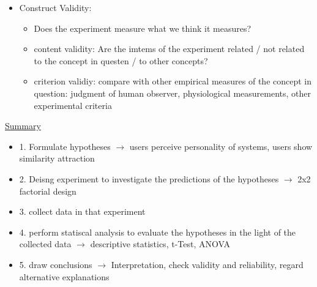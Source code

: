 \documentclass[a4paper,10pt,oneside]{article}
\begin{document}
\begin{itemize}
\begin{itemize}
\begin{itemize}
			 		\end{itemize}
			 	\item Construct Validity:
			 		\begin{itemize}
			 			\item Does the experiment measure what we think it measures?
			 			\item content validity: Are the imtems of the experiment related / not related to the concept in questen / to other concepts?
			 			\item criterion validiy: compare with other empirical measures of the concept in question: judgment of human observer, physiological measurements, other experimental criteria
			 		\end{itemize}
			 \end{itemize}
	\end{itemize}

\underline{Summary} \\
 	\begin{itemize}
 		\item 1. Formulate hypotheses $\rightarrow$ users perceive personality of systems, users show similarity attraction 
 		\item 2. Deisng experiment to investigate the predictions of the hypotheses $\rightarrow$ 2x2 factorial design
 		\item 3. collect data in that experiment
 		\item 4. perform statiscal analysis to evaluate the hypotheses in the light of the collected data $\rightarrow$ descriptive statistics, t-Test, ANOVA
 		\item 5. draw conclusions $\rightarrow$ Interpretation, check validity and reliability, regard alternative explanations
 	\end{itemize}
 		
 		
 		
 		
 		
 		
 		
 		
 		
 		
 		
 		
 		
 		
 		
 		
 		
 		
 		
 		
 		
 		
 		
 		
 		
 		
 		
 		
 		
 		
 		
 		
 		
 		
 		
 		
 		
 		
 		
 		
 		
 		
 		
 		
 		
 		
 		
 	

 
\end{document}
